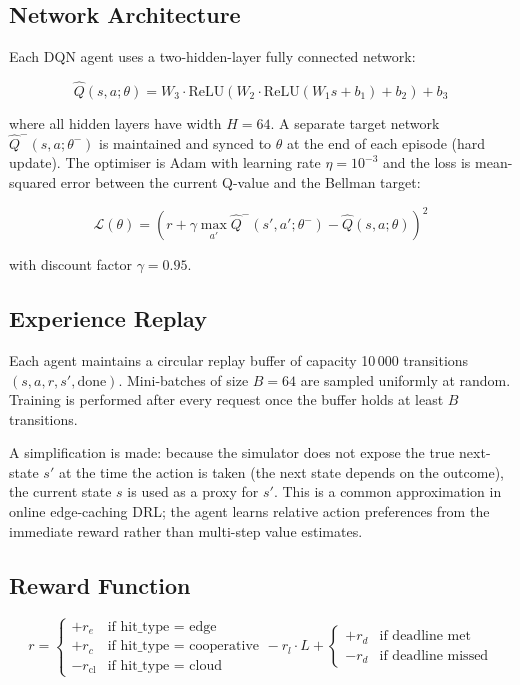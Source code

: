 \documentclass[12pt]{article}
\begin{document}
\subsection{Network Architecture}

Each DQN agent uses a two-hidden-layer fully connected network:

\begin{equation}
  \hat{Q}(s, a; \theta) = W_3 \cdot \text{ReLU}(W_2 \cdot \text{ReLU}(W_1 s + b_1) + b_2) + b_3
\end{equation}

where all hidden layers have width $H = 64$. A separate target network $\hat{Q}^-(s, a; \theta^-)$ is maintained and synced to $\theta$ at the end of each episode (hard update). The optimiser is Adam with learning rate $\eta = 10^{-3}$ and the loss is mean-squared error between the current Q-value and the Bellman target:

\begin{equation}
  \mathcal{L}(\theta) = \left( r + \gamma \max_{a'} \hat{Q}^-(s', a'; \theta^-) - \hat{Q}(s, a; \theta) \right)^2
\end{equation}

with discount factor $\gamma = 0.95$.

\subsection{Experience Replay}

Each agent maintains a circular replay buffer of capacity 10\,000 transitions $(s, a, r, s', \text{done})$. Mini-batches of size $B = 64$ are sampled uniformly at random. Training is performed after every request once the buffer holds at least $B$ transitions.

A simplification is made: because the simulator does not expose the true next-state $s'$ at the time the action is taken (the next state depends on the outcome), the current state $s$ is used as a proxy for $s'$. This is a common approximation in online edge-caching DRL; the agent learns relative action preferences from the immediate reward rather than multi-step value estimates.

\subsection{Reward Function}
\label{sec:reward}

\begin{equation}
  r = \begin{cases} +r_e & \text{if hit\_type = edge} \\ +r_c & \text{if hit\_type = cooperative} \\ -r_{\text{cl}} & \text{if hit\_type = cloud} \end{cases}
  - r_{l} \cdot L + \begin{cases} +r_d & \text{if deadline met} \\ -r_d & \text{if deadline missed} \end{cases}
\end{equation}
\end{document}
